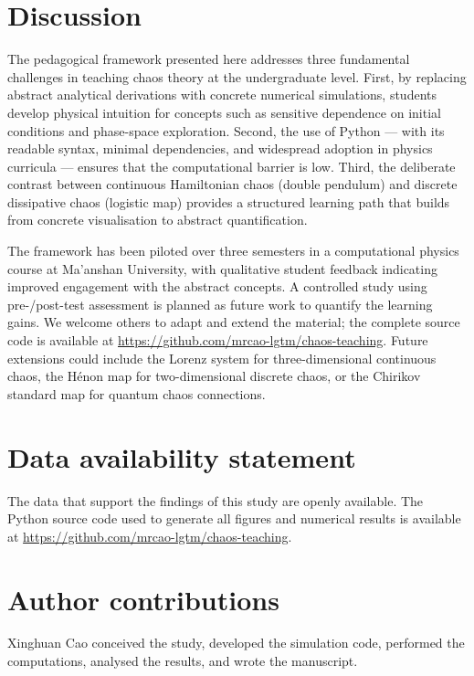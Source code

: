\documentclass[aps,twocolumn,showpacs]{revtex4-2}
\begin{document}
\section{Discussion}
\label{sec:discussion}

The pedagogical framework presented here addresses three fundamental challenges in teaching chaos theory
at the undergraduate level. First, by replacing abstract analytical derivations with concrete numerical
simulations, students develop physical intuition for concepts such as sensitive dependence on initial
conditions and phase-space exploration. Second, the use of Python --- with its readable syntax, minimal
dependencies, and widespread adoption in physics curricula --- ensures that the computational barrier is
low. Third, the deliberate contrast between continuous Hamiltonian chaos (double pendulum) and discrete
dissipative chaos (logistic map) provides a structured learning path that builds from concrete
visualisation to abstract quantification.

The framework has been piloted over three semesters in a computational physics course at Ma'anshan University, with qualitative student feedback indicating improved engagement with the abstract concepts. A controlled study using pre-/post-test assessment is planned as future work to quantify the learning gains. We welcome others to adapt and extend the material; the complete source code is available at
\url{https://github.com/mrcao-lgtm/chaos-teaching}. Future extensions could include the Lorenz system
for three-dimensional continuous chaos, the H\'enon map for two-dimensional discrete chaos, or the
Chirikov standard map for quantum chaos connections.

\section*{Data availability statement}

The data that support the findings of this study are openly available. The Python source code used to
generate all figures and numerical results is available at
\url{https://github.com/mrcao-lgtm/chaos-teaching}.

\section*{Author contributions}

Xinghuan Cao conceived the study, developed the simulation code, performed the computations, analysed
the results, and wrote the manuscript.
\end{document}
